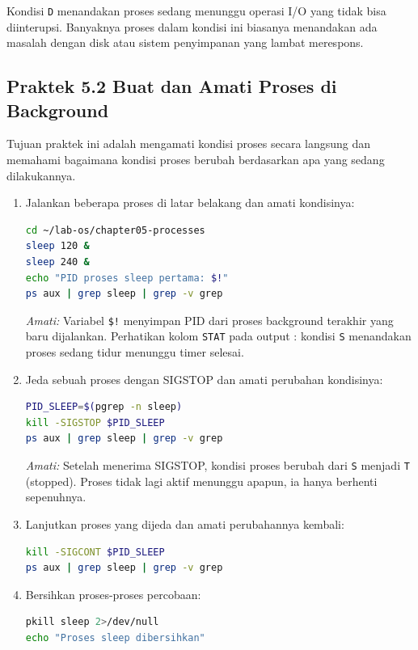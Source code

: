 Kondisi \texttt{D} menandakan proses sedang menunggu operasi I/O yang tidak bisa
diinterupsi. Banyaknya proses dalam kondisi ini biasanya menandakan ada masalah dengan
disk atau sistem penyimpanan yang lambat merespons.

\subsection*{Praktek 5.2 Buat dan Amati Proses di Background}

Tujuan praktek ini adalah mengamati kondisi proses secara langsung dan memahami
bagaimana kondisi proses berubah berdasarkan apa yang sedang dilakukannya.

\begin{enumerate}
    \item Jalankan beberapa proses di latar belakang dan amati kondisinya:
\begin{lstlisting}[language=bash, caption={Menjalankan proses di background}]
cd ~/lab-os/chapter05-processes
sleep 120 &
sleep 240 &
echo "PID proses sleep pertama: $!"
ps aux | grep sleep | grep -v grep
\end{lstlisting}
    \textit{Amati:} Variabel \texttt{\$!} menyimpan PID dari proses background terakhir yang baru dijalankan. Perhatikan kolom \texttt{STAT} pada output : kondisi \texttt{S} menandakan proses sedang tidur menunggu timer selesai.

    \item Jeda sebuah proses dengan SIGSTOP dan amati perubahan kondisinya:
\begin{lstlisting}[language=bash, caption={Menjeda proses dan mengamati perubahan status}]
PID_SLEEP=$(pgrep -n sleep)
kill -SIGSTOP $PID_SLEEP
ps aux | grep sleep | grep -v grep
\end{lstlisting}
    \textit{Amati:} Setelah menerima SIGSTOP, kondisi proses berubah dari \texttt{S} menjadi \texttt{T} (stopped). Proses tidak lagi aktif menunggu apapun, ia hanya berhenti sepenuhnya.

    \item Lanjutkan proses yang dijeda dan amati perubahannya kembali:
\begin{lstlisting}[language=bash, caption={Melanjutkan proses yang dijeda}]
kill -SIGCONT $PID_SLEEP
ps aux | grep sleep | grep -v grep
\end{lstlisting}

    \item Bersihkan proses-proses percobaan:
\begin{lstlisting}[language=bash, caption={Membersihkan proses percobaan}]
pkill sleep 2>/dev/null
echo "Proses sleep dibersihkan"
\end{lstlisting}
\end{enumerate}

